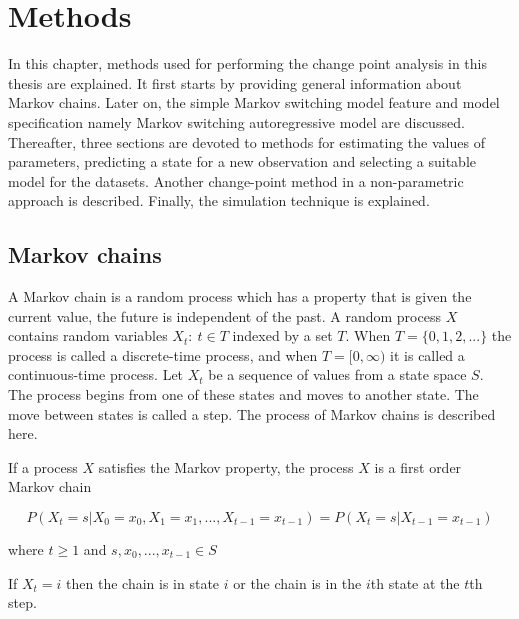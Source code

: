 
\lhead[\chaptername~\thechapter]{\rightmark}

\rhead[\leftmark]{}

\lfoot[\thepage]{}

\cfoot{}

\rfoot[]{\thepage}

\chapter{Methods}

In this chapter, methods used for performing the change point analysis
in this thesis are explained. It first starts by providing general
information about Markov chains. Later on, the simple Markov switching
model feature and model specification namely Markov switching autoregressive
model are discussed. Thereafter, three sections are devoted to methods
for estimating the values of parameters, predicting a state for a
new observation and selecting a suitable model for the datasets. Another
change-point method in a non-parametric approach is described. Finally,
the simulation technique  is explained.

\section{Markov chains\label{sec:Markov-chains}}

A Markov chain is a random process which has a property that is given
the current value, the future is independent of the past. A random
process $X$ contains random variables $X_{t}:\:t\in T$ indexed by
a set $T$. When $T=\{0,1,2,...\}$ the process is called a discrete-time
process, and when $T=[0,\infty)$ it is called a continuous-time process.
Let $X_{t}$ be a sequence of values from a state space $S$. The
process begins from one of these states and moves to another state.
The move between states is called a step. The process of Markov chains
is described here.
\begin{defn}
\citep[p.214]{grimmett2001probability} If a process $X$ satisfies
the Markov property, the process $X$ is a first order Markov chain

\[
P(X_{t}=s|X_{0}=x_{0},X_{1}=x_{1},...,X_{t-1}=x_{t-1})=P(X_{t}=s|X_{t-1}=x_{t-1})
\]

where $t\ge1$ and $s,x_{0},...,x_{t-1}\in S$
\end{defn}
If $X_{t}=i$ then the chain is in state $i$ or the chain is in the
$i$th state at the $t$th step. 

